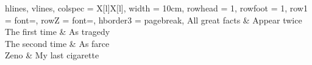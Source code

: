 \begin{codestore}[st=table:rowhead]
  \begin{longtblr}[
    caption = {Rows repeated across a page break},
    ]{
    hlines, vlines,
    colspec = {X[l]X[l]}, width = 10cm,
    rowhead = 1, rowfoot = 1,
    row{1} = {font=\bfseries},
    row{Z} = {font=\itshape},
    hborder{3} = {pagebreak},
    }
    All great facts & Appear twice      \\
    The first time  & As tragedy        \\
    The second time & As farce          \\
    Zeno            & My last cigarette
  \end{longtblr}\end{codestore}
